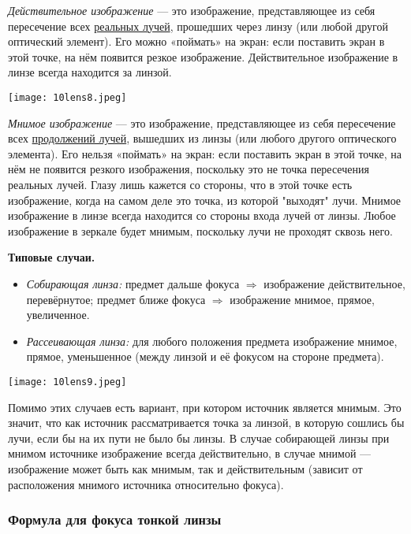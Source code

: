 \documentclass[12pt, a4paper]{article}%
\begin{document}
\textit{Действительное изображение} — это изображение, представляющее из себя 
пересечение всех \underline{реальных лучей}, прошедших через линзу (или любой 
другой оптический элемент). Его можно «поймать» на экран: если поставить экран
в этой точке, на нём появится резкое изображение. Действительное изображение в
линзе всегда находится за линзой.  

\begin{center}
\texttt{[image: 10lens8.jpeg]}
\label{fig:mpr}
\end{center}

\textit{Мнимое изображение} — это изображение, представляющее из себя
пересечение всех \underline{продолжений лучей}, вышедших из линзы (или любого
другого оптического элемента). Его нельзя «поймать» на экран: если поставить
экран в этой точке, на нём не появится резкого изображения, поскольку это не
точка пересечения реальных лучей. Глазу лишь кажется со стороны,
что в этой точке есть изображение, когда на самом деле это точка, из которой 
"выходят" лучи. Мнимое изображение в линзе всегда находится со стороны входа лучей от линзы. Любое изображение в зеркале будет мнимым, поскольку лучи не проходят сквозь него.


\textbf{Типовые случаи.}
\begin{itemize}
  \item \emph{Собирающая линза:} предмет дальше фокуса $\Rightarrow$ изображение действительное, перевёрнутое; предмет ближе фокуса $\Rightarrow$ изображение мнимое, прямое, увеличенное.
  \item \emph{Рассеивающая линза:} для любого положения предмета изображение мнимое, прямое, уменьшенное (между линзой и её фокусом на стороне предмета).
\end{itemize}

\begin{center}
\texttt{[image: 10lens9.jpeg]}
\label{fig:mpr}
\end{center}

Помимо этих случаев есть вариант, при котором источник является мнимым.
Это значит, что как источник рассматривается точка за линзой, в которую сошлись
бы лучи, если бы на их пути не было бы линзы. В случае собирающей линзы при мнимом источнике изображение всегда действительно, в случае мнимой --- изображение может быть как мнимым, так и действительным (зависит от расположения мнимого источника относительно фокуса). 

\subsubsection*{Формула для фокуса тонкой линзы}
\end{document}

